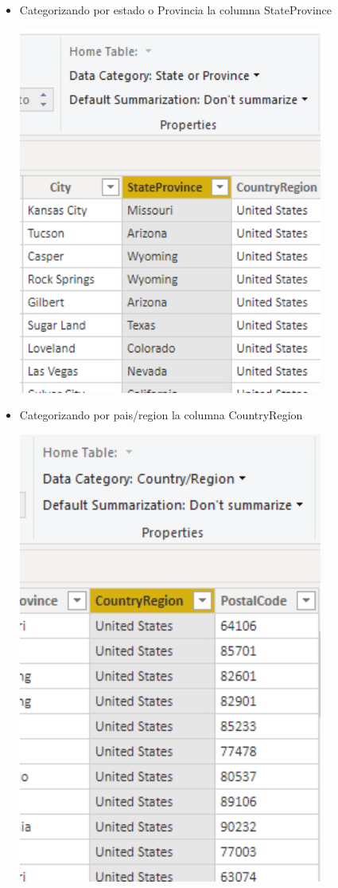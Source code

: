 \begin{itemize}
	\item Categorizando por estado o Provincia la columna StateProvince
	\begin{center}
	\includegraphics[width=10cm]{./Imagenes/Captura2-7} 
	\end{center}
\end{itemize} 
\begin{itemize}
	\item Categorizando por pais/region la columna CountryRegion
	\begin{center}
	\includegraphics[width=10cm]{./Imagenes/Captura2-8} 
	\end{center}
\end{itemize} 
